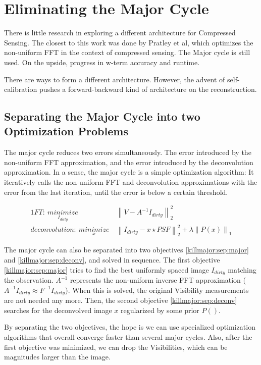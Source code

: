 \section{Eliminating the Major Cycle}\label{killmajor}
There is little research in exploring a different architecture for Compressed Sensing. The closest to this work was done by Pratley et al\cite{pratley2017robust}, which optimizes the non-uniform FFT in the context of compressed sensing. The Major cycle is still used. On the upside, progress in w-term accuracy and runtime. 

There are ways to form a different architecture. However, the advent of self-calibration pushes a forward-backward kind of architecture on the reconstruction. 

\subsection{Separating the Major Cycle into two Optimization Problems}
The major cycle reduces two errors simultaneously. The error introduced by the non-uniform FFT approximation, and the error introduced by the deconvolution approximation. In a sense, the major cycle is a simple optimization algorithm: It iteratively calls the non-uniform FFT and deconvolution approximations with the error from the last iteration, until the error is below a certain threshold.

\begin{alignat}{1}
FT:\: \underset{I_{dirty}}{minimize} \:& \left \|  V - A^{-1}I_{dirty} \right \|_2^2\label{killmajor:sep:major}\\
deconvolution:\: \underset{x}{minimize} \:& \left \| I_{dirty} - x \star PSF \right \|_2^2 + \lambda \left \| P(x) \right \|_1 \label{killmajor:sep:deconv}
\end{alignat}

The major cycle can also be separated into two objectives \eqref{killmajor:sep:major} and \eqref{killmajor:sep:deconv}, and solved in sequence. The first objective \eqref{killmajor:sep:major} tries to find the best uniformly spaced image $I_{dirty}$ matching the observation. $A^{-1}$ represents the non-uniform inverse FFT approximation ($A^{-1}I_{dirty} \approx F^{-1}I_{dirty}$). When this is solved, the original Visibility measurements are not needed any more. Then, the second objective \eqref{killmajor:sep:deconv} searches for the deconvolved image $x$ regularized by some prior $P()$.

By separating the two objectives, the hope is we can use specialized optimization algorithms that overall converge faster than several major cycles. Also, after the first objective was minimized, we can drop the Visibilities, which can be magnitudes larger than the image. 

